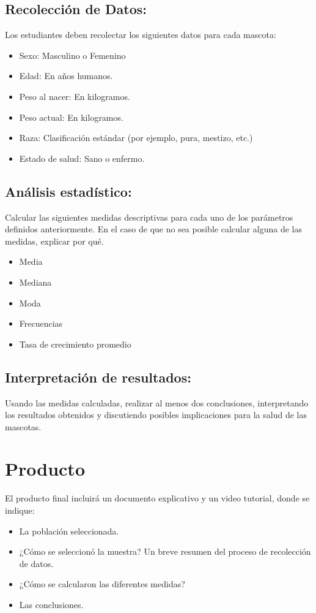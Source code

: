 \documentclass[a4,11pt]{aleph-notas}
\begin{document}
\subsection{Recolecci\'on de Datos:}
Los estudiantes deben recolectar los siguientes datos para cada mascota:
	\begin{itemize}
		\item Sexo: Masculino o Femenino
		\item Edad: En años humanos.
		\item Peso al nacer: En kilogramos.
		\item Peso actual: En kilogramos.
		\item Raza: Clasificaci\'on est\'andar (por ejemplo, pura, mestizo, etc.)
		\item Estado de salud: Sano o enfermo.
	\end{itemize}
\subsection{An\'alisis estad\'istico:}
Calcular las siguientes medidas descriptivas para cada uno de los par\'ametros definidos anteriormente. En el caso de que no sea posible calcular alguna de las medidas, explicar por qu\'e.
	\begin{itemize}
	\item Media
	\item Mediana 
	\item Moda
	\item Frecuencias
	\item Tasa de crecimiento promedio
\end{itemize}
\subsection{Interpretaci\'on de resultados:}
Usando las medidas calculadas, realizar al menos dos conclusiones, interpretando los resultados obtenidos y discutiendo posibles implicaciones para la salud de las mascotas.
\section{Producto}
El producto final incluirá un documento explicativo y un video tutorial, donde se indique:
\begin{itemize}
	\item La población seleccionada.
	\item ¿Cómo se seleccionó la muestra? Un breve resumen del proceso de recolección de datos.
	\item ¿Cómo se calcularon las diferentes medidas?
	\item Las conclusiones.
\end{itemize}
\end{document}
